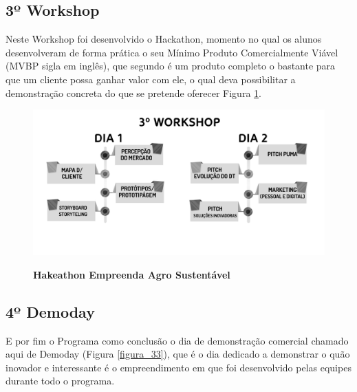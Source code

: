 \subsection{3º Workshop}
 
Neste Workshop foi desenvolvido o Hackathon, momento no qual os alunos desenvolveram de forma prática o seu Mínimo Produto Comercialmente Viável (MVBP sigla em inglês), que segundo  é um produto completo o bastante para que um cliente possa ganhar valor com ele, o qual deva possibilitar a demonstração concreta do que se pretende oferecer Figura \ref{figura_32}. 


\begin{figure}[H]
\centering
\caption{\textbf{Hakeathon Empreenda Agro Sustentável}}
\includegraphics[scale=0.4]{Imagens/workshop-03.png}
\label{figura_32}
\end{figure}


\subsection{4º Demoday}

E por fim o Programa como conclusão o dia de demonstração comercial chamado aqui de Demoday (Figura \ref{figura_33}), que é o dia dedicado a demonstrar o quão inovador e interessante é o empreendimento em que foi desenvolvido pelas equipes durante todo o programa.


